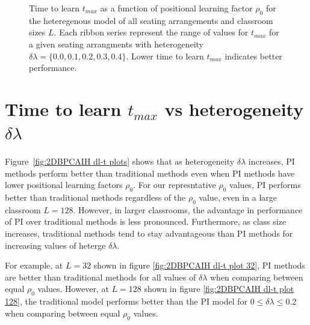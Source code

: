 \begin{figure}[htbp!]
   \caption{Time to learn $t_{max}$ as a function of positional learning factor $\rho_0$ for the heteregenous model of all seating arrangements and classroom sizes $L$. 
   Each ribbon series represent the range of values for $t_{max}$ for a given seating arrangments with heterogeneity $\delta\lambda = \lbrace 0.0, 0.1, 0.2, 0.3, 0.4 \rbrace$.
   Lower time to learn $t_{max}$ indicates better performance.
   }
   \label{fig:2DBPCAIH t-rho ribbon plot}
\end{figure}

\newpage %

\section{Time to learn $t_{max}$ vs heterogeneity $\delta\lambda$}\label{sec:BPCAIH t vs dl}

Figure~\ref{fig:2DBPCAIH dl-t plots} shows that as heterogeneity $\delta\lambda$ increases, PI methods perform better than traditional methods even when PI methods have lower positional learning factors $\rho_0$. For our represntative $\rho_0$ values, PI performs better than traditional methods regardless of the $\rho_0$ value, even in a large classroom $L=128$. 
However, in larger classrooms, the advantage in performance of PI over traditional methods is less pronounced. 
Furthermore, as class size increases, traditional methods tend to stay advantageous than PI methods for increasing values of heterge $\delta\lambda$.

For example, at $L=32$ shown in figure \ref{fig:2DBPCAIH dl-t plot 32}, PI methods are better than traditional methods for all values of $\delta\lambda$ when comparing between equal $\rho_0$ values. 
However, at $L=128$ shown in figure \ref{fig:2DBPCAIH dl-t plot 128}, the traditional model performs better than the PI model for $0 \leq \delta\lambda \leq 0.2$ when comparing between equal $\rho_0$ values.

